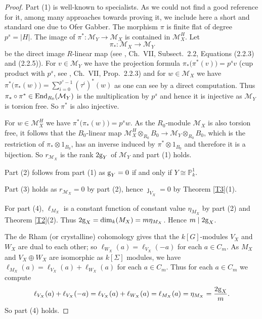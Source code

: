 \documentclass[11pt]{amsart}
\def\End{\textup{End}}
\begin{document}
\begin{proof}
Part (1) is well-known to specialists. As we could not find a good reference for it, among many approaches towards proving it, we include here a short and standard one due to Ofer Gabber. The morphism $\pi$ is finite flat of degree $p^s=|H|$. The image of $\pi^*:\mathcal M_Y\rightarrow\mathcal M_X$ is contained in $\mathcal M_X^H$. Let 
$$\pi_*:\mathcal M_X\rightarrow\mathcal M_Y$$ 
be the direct image $R$-linear map (see \cite{Be}, Ch.\ VII, Subsect.\ 2.2, Equations (2.2.3) and (2.2.5)). For $v\in\mathcal M_Y$ we have the projection formula $\pi_*\bigl(\pi^*(v)\bigr)=p^sv$ (cup product with $p^s$, see \cite{Be}, Ch.\ VII, Prop.\ 2.2.3) and for $w\in\mathcal M_X$ we have $\pi^*\bigl(\pi_*(w)\bigr)=\sum_{i=0}^{p^s-1} (\tau^i)^*(w)$ as one can see by a direct computation. Thus $\pi_*\circ\pi^*\in\End_{R_0}(\mathcal M_Y)$ is the multiplication by $p^s$ and hence it is injective as $\mathcal M_Y$ is torsion free. So $\pi^*$ is also injective.

For $w\in\mathcal M_X^H$ we have $\pi^*\bigl(\pi_*(w)\bigr)=p^sw$. As the $R_0$-module $\mathcal M_X$ is also torsion free, it follows that the $B_0$-linear map $\mathcal M_X^H\otimes_{R_0} B_0\rightarrow\mathcal M_Y\otimes_{R_0} B_0$, which is the restriction of $\pi_*\otimes 1_{B_0}$, has an inverse induced by $\pi^*\otimes 1_{B_0}$ and therefore it is a bijection. So $r_{\mathcal M_X}$ is the rank $2\textup{g}_Y$ of $\mathcal M_Y$ and part (1) holds.

Part (2) follows from part (1) as $\textup{g}_Y=0$ if and only if $Y\cong\mathbb P^1_k$.

Part (3) holds as $r_{\mathcal M_X}=0$ by part (2), hence $\jmath_{V_X}=0$ by Theorem \ref{T3}(1).

For part (4), $\ell_{M_X}$ is a constant function of constant value $\eta_{M_X}$ by part (2) and Theorem \ref{T2}(2). Thus $2\textup{g}_X=\dim_k(M_X)=m\eta_{M_X}$. Hence $m\mid 2\textup{g}_X$. 

The de Rham (or crystalline) cohomology gives that the $k[G]$-modules $V_X$ and $W_X$ are dual to each other; so $\ell_{W_X}(a)=\ell_{V_X}(-a)$ for each $a\in C_m$. As $M_X$ and $V_X\oplus W_X$ are isomorphic as $k[\Sigma]$ modules, we have $\ell_{M_X}(a)=\ell_{V_X}(a)+\ell_{W_X}(a)$ 
for each $a\in C_m$. Thus for each $a\in C_m$ we compute
$$\ell_{V_X}(a)+\ell_{V_X}(-a)=\ell_{V_X}(a)+\ell_{W_X}(a)=\ell_{M_X}(a)=\eta_{M_X}=\frac{2\textup{g}_X}{m}.$$
So part (4) holds.\end{proof}
\end{document}
